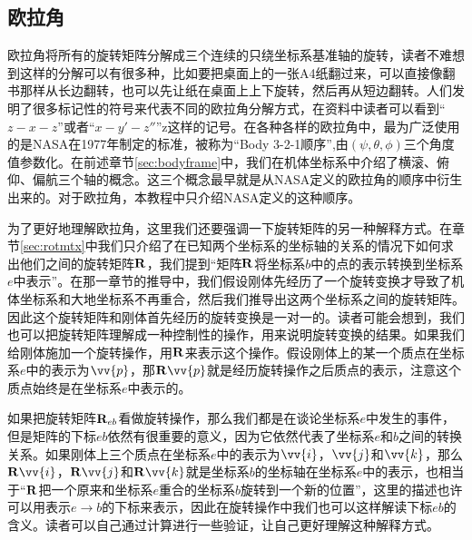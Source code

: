 \documentclass[11pt]{article}
\begin{document}
\subsection{欧拉角}
欧拉角将所有的旋转矩阵分解成三个连续的只绕坐标系基准轴的旋转，读者不难想到这样的分解可以有很多种，比如要把桌面上的一张A4纸翻过来，可以直接像翻书那样从长边翻转，也可以先让纸在桌面上上下旋转，然后再从短边翻转。人们发明了很多标记性的符号来代表不同的欧拉角分解方式，在资料中读者可以看到“$z-x-z$”或者“$x-y'-z''$”z这样的记号。在各种各样的欧拉角中，最为广泛使用的是NASA在1977年制定的标准，被称为“Body 3-2-1顺序”,由$(\psi, \theta, \phi)$三个角度值参数化。在前述章节\ref{sec:bodyframe}中，我们在机体坐标系中介绍了横滚、俯仰、偏航三个轴的概念。这三个概念最早就是从NASA定义的欧拉角的顺序中衍生出来的。对于欧拉角，本教程中只介绍NASA定义的这种顺序。

为了更好地理解欧拉角，这里我们还要强调一下旋转矩阵的另一种解释方式。在章节\ref{sec:rotmtx}中我们只介绍了在已知两个坐标系的坐标轴的关系的情况下如何求出他们之间的旋转矩阵${\bf R}$，我们提到“矩阵${\bf R}$将坐标系$b$中的点的表示转换到坐标系$e$中表示”。在那一章节的推导中，我们假设刚体先经历了一个旋转变换才导致了机体坐标系和大地坐标系不再重合，然后我们推导出这两个坐标系之间的旋转矩阵。因此这个旋转矩阵和刚体首先经历的旋转变换是一对一的。读者可能会想到，我们也可以把旋转矩阵理解成一种控制性的操作，用来说明旋转变换的结果。如果我们给刚体施加一个旋转操作，用${\bf R}$来表示这个操作。假设刚体上的某一个质点在坐标系$e$中的表示为$\vv{p}$，那${\bf R}\vv{p}$就是经历旋转操作之后质点的表示，注意这个质点始终是在坐标系$e$中表示的。

如果把旋转矩阵${\bf R}_{eb}$看做旋转操作，那么我们都是在谈论坐标系$e$中发生的事件，但是矩阵的下标$eb$依然有很重要的意义，因为它依然代表了坐标系$e$和$b$之间的转换关系。如果刚体上三个质点在坐标系$e$中的表示为$\vv{i}$，$\vv{j}$和$\vv{k}$，那么${\bf R}\vv{i}$，${\bf R}\vv{j}$和${\bf R}\vv{k}$就是坐标系$b$的坐标轴在坐标系$e$中的表示，也相当于“${\bf R}$把一个原来和坐标系$e$重合的坐标系$b$旋转到一个新的位置”，这里的描述也许可以用表示$e\rightarrow b$的下标来表示，因此在旋转操作中我们也可以这样解读下标$eb$的含义。读者可以自己通过计算进行一些验证，让自己更好理解这种解释方式。
\end{document}
